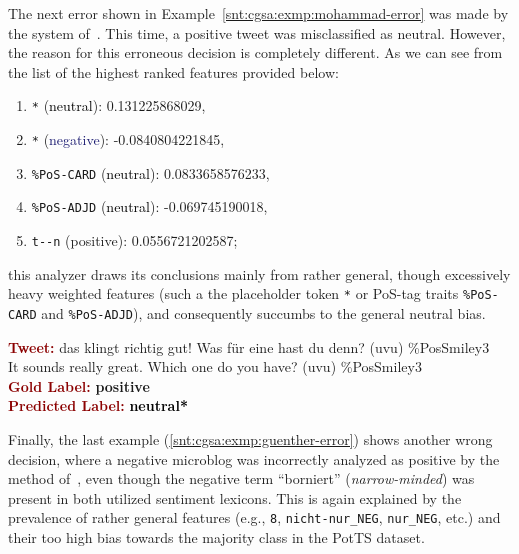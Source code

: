 The next error shown in Example~\ref{snt:cgsa:exmp:mohammad-error} was
made by the system of~\citet{Mohammad:13}.  This time, a positive
tweet was misclassified as neutral.  However, the reason for this
erroneous decision is completely different.  As we can see from the
list of the highest ranked features provided below:
\begin{enumerate}
\item \texttt{*} (\textcolor{black}{neutral}): 0.131225868029,
\item \texttt{*} (\textcolor{midnightblue}{negative}): -0.0840804221845,
\item \texttt{\%PoS-CARD} (\textcolor{black}{neutral}): 0.0833658576233,
\item \texttt{\%PoS-ADJD} (\textcolor{black}{neutral}): -0.069745190018,
\item \texttt{t-\textvisiblespace{}-n} (\textcolor{green3}{positive}): 0.0556721202587;
\end{enumerate}
this analyzer draws its conclusions mainly from rather general, though
excessively heavy weighted features (such a the placeholder token
\texttt{*} or PoS-tag traits \texttt{\%PoS-CARD} and
\texttt{\%PoS-ADJD}), and consequently succumbs to the general neutral
bias.

\begin{example}\label{snt:cgsa:exmp:mohammad-error}
  \noindent\textup{\bfseries\textcolor{darkred}{Tweet:}} {\upshape das
    klingt richtig gut! Was f\"ur eine hast du denn? (uvu) \%PosSmiley3}\\
  \noindent It sounds really great.  Which one do you have? (uvu) \%PosSmiley3\\[\exampleSep]
  \noindent\textup{\bfseries\textcolor{darkred}{Gold Label:}}\hspace*{4.3em}\textbf{%
    \upshape\textcolor{green3}{positive}}\\
 \noindent\textup{\bfseries\textcolor{darkred}{Predicted Label:}}\hspace*{2em}\textbf{%
    \upshape\textcolor{black}{neutral*}}
\end{example}

Finally, the last example (\ref{snt:cgsa:exmp:guenther-error}) shows
another wrong decision, where a negative microblog was incorrectly
analyzed as positive by the method of~\citet{Guenther:14}, even though
the negative term ``borniert'' (\emph{narrow-minded}) was present in
both utilized sentiment lexicons.  This is again explained by the
prevalence of rather general features (e.g., \texttt{8},
\texttt{nicht-nur\_NEG}, \texttt{nur\_NEG}, etc.) and their too high
bias towards the majority class in the PotTS dataset.

